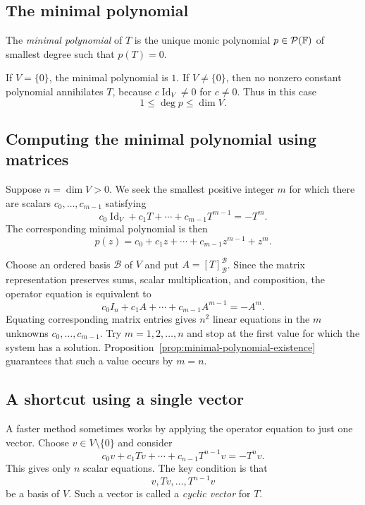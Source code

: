 \subsection{The minimal polynomial}

\begin{definition}
  The \emph{minimal polynomial} of $T$ is the unique monic
  polynomial $p\in\mathcal P(\mathbb{F})$ of smallest degree such
  that $p(T)=0$.
\end{definition}

If $V=\{0\}$, the minimal polynomial is $1$. If $V\neq\{0\}$,
then no nonzero constant polynomial annihilates $T$, because
$c\operatorname{Id}_V\neq0$ for $c\neq0$. Thus in this case
\[
  1\leq\deg p\leq\dim V.
\]

\subsection{Computing the minimal polynomial using matrices}

Suppose $n=\dim V>0$. We seek the smallest positive integer $m$
for which there are scalars $c_0,\ldots,c_{m-1}$ satisfying
\[
  c_0\operatorname{Id}_V+c_1T+\cdots+c_{m-1}T^{m-1}=-T^m.
\]
The corresponding minimal polynomial is then
\[
  p(z)=c_0+c_1z+\cdots+c_{m-1}z^{m-1}+z^m.
\]

Choose an ordered basis $\mathcal B$ of $V$ and put
$A=[T]_{\mathcal B}^{\mathcal B}$. Since the matrix representation
preserves sums, scalar multiplication, and composition, the
operator equation is equivalent to
\[
  c_0I_n+c_1A+\cdots+c_{m-1}A^{m-1}=-A^m.
\]
Equating corresponding matrix entries gives $n^2$ linear equations
in the $m$ unknowns $c_0,\ldots,c_{m-1}$. Try $m=1,2,\ldots,n$
and stop at the first value for which the system has a solution.
Proposition~\ref{prop:minimal-polynomial-existence} guarantees
that such a value occurs by $m=n$.

\subsection{A shortcut using a single vector}

A faster method sometimes works by applying the operator equation
to just one vector. Choose $v\in V\setminus\{0\}$ and consider
\[
  c_0v+c_1Tv+\cdots+c_{n-1}T^{n-1}v=-T^nv.
\]
This gives only $n$ scalar equations. The key condition is that
\[
  v,Tv,\ldots,T^{n-1}v
\]
be a basis of $V$. Such a vector is called a \emph{cyclic vector}
for $T$.

